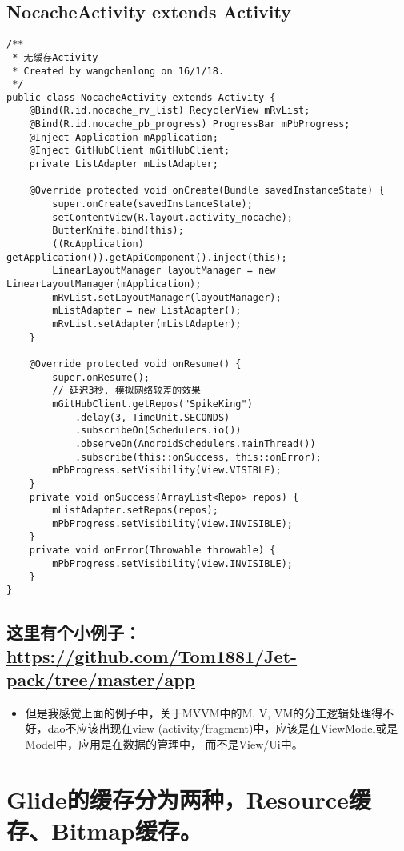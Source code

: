 \documentclass[9pt, b5paper]{article}
\begin{document}
\subsection{NocacheActivity extends Activity}
\label{sec-7-4}
\begin{verbatim}
/**
 * 无缓存Activity
 * Created by wangchenlong on 16/1/18.
 */
public class NocacheActivity extends Activity {
    @Bind(R.id.nocache_rv_list) RecyclerView mRvList;
    @Bind(R.id.nocache_pb_progress) ProgressBar mPbProgress;
    @Inject Application mApplication;
    @Inject GitHubClient mGitHubClient;
    private ListAdapter mListAdapter;

    @Override protected void onCreate(Bundle savedInstanceState) {
        super.onCreate(savedInstanceState);
        setContentView(R.layout.activity_nocache);
        ButterKnife.bind(this);
        ((RcApplication) getApplication()).getApiComponent().inject(this);
        LinearLayoutManager layoutManager = new LinearLayoutManager(mApplication);
        mRvList.setLayoutManager(layoutManager);
        mListAdapter = new ListAdapter();
        mRvList.setAdapter(mListAdapter);
    }

    @Override protected void onResume() {
        super.onResume();
        // 延迟3秒, 模拟网络较差的效果
        mGitHubClient.getRepos("SpikeKing")
            .delay(3, TimeUnit.SECONDS)
            .subscribeOn(Schedulers.io())
            .observeOn(AndroidSchedulers.mainThread())
            .subscribe(this::onSuccess, this::onError);
        mPbProgress.setVisibility(View.VISIBLE);
    }
    private void onSuccess(ArrayList<Repo> repos) {
        mListAdapter.setRepos(repos);
        mPbProgress.setVisibility(View.INVISIBLE);
    }
    private void onError(Throwable throwable) {
        mPbProgress.setVisibility(View.INVISIBLE);
    }
}
\end{verbatim}
\subsection{这里有个小例子： \url{https://github.com/Tom1881/Jet-pack/tree/master/app}}
\label{sec-7-5}
\begin{itemize}
\item 但是我感觉上面的例子中，关于MVVM中的M, V, VM的分工逻辑处理得不好，dao不应该出现在view (activity/fragment)中，应该是在ViewModel或是Model中，应用是在数据的管理中， 而不是View/Ui中。
\end{itemize}

\section{Glide的缓存分为两种，Resource缓存、Bitmap缓存。}
\label{sec-8}
\end{document}
